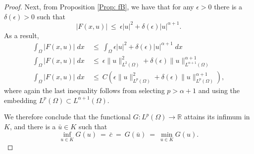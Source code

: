 \documentclass[10pt,a4paper]{amsart}
\def\R{\mathbb{R}}
\def\ep{\epsilon}
\begin{document}
\begin{proof}
{Next, from Proposition \ref{Prop: fB}, we have that for any $\ep >0$ there is a $\delta(\ep) >0$ such that 
\[ \left| F(x,u) \right| \ \leq \ \ep |u|^2 + \delta(\ep) |u|^{\alpha+1}.\]
As a result,
\begin{align*}
\int_\Omega \left| F(x,u) \right| \;dx & \ \leq \ \int_\Omega \ep |u|^2 + \delta(\ep) |u|^{\alpha+1} \;dx\\
\int_\Omega \left| F(x,u) \right| \;dx & \ \leq \ \ep \|u\|_{L^2(\Omega)}^2 + \delta(\ep)  \|u\|_{L^{\alpha+1}(\Omega)}^{\alpha+1} \\
\int_\Omega \left| F(x,u) \right| \;dx & \ \leq \ C( \ep \|u\|_{L^p(\Omega)}^2 + \delta(\ep)  \|u\|_{L^{p}(\Omega)}^{\alpha+1} ) ,
\end{align*}
where again the last inequality follows from selecting $p> \alpha +1$ and using the embedding $L^p(\Omega) \subset L^{\alpha+1}(\Omega)$.


We therefore conclude that the functional $G:L^p(\Omega) \longrightarrow \R$  attains its infimum in $K$, and there is a $\bar{u} \in K$ such that 
\[  \inf_{u \in K} G(u) \ = \ \bar{c} \ = \ G(\bar{u}) \ = \  \min_{u \in K } G(u).\] 
}










\end{proof}
\end{document}

